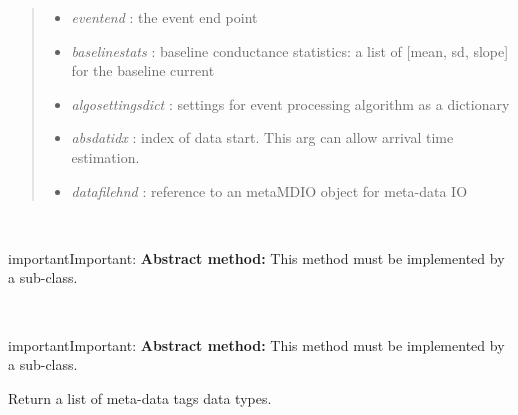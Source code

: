 \documentclass[letterpaper,10pt,english]{sphinxmanual}
\begin{document}
\begin{fulllineitems}
\begin{quote}
\begin{description}
\begin{itemize}
\item {} 
\emph{eventend} :                  the event end point

\item {} 
\emph{baselinestats} :     baseline conductance statistics: a list of {[}mean, sd, slope{]} for the baseline current

\item {} 
\emph{algosettingsdict} :  settings for event processing algorithm as a dictionary

\item {} 
\emph{absdatidx} :                 index of data start. This arg can allow arrival time estimation.

\item {} 
\emph{datafilehnd} :               reference to an metaMDIO object for meta-data IO

\end{itemize}

\end{description}\end{quote}

\begin{fulllineitems}
\label{api-doc/mosaic.meta:mosaic.metaEventProcessor.metaEventProcessor._init}~
\begin{notice}{important}{Important:}
\textbf{Abstract method:} This method must be implemented by a sub-class.
\end{notice}

\end{fulllineitems}


\begin{fulllineitems}
\label{api-doc/mosaic.meta:mosaic.metaEventProcessor.metaEventProcessor._mdHeadingDataType}~
\begin{notice}{important}{Important:}
\textbf{Abstract method:} This method must be implemented by a sub-class.
\end{notice}

Return a list of meta-data tags data types.

\end{fulllineitems}



\end{fulllineitems}
\end{document}
